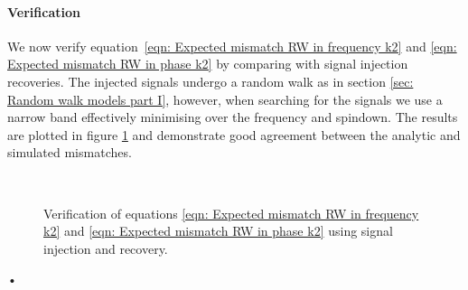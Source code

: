 \paragraph{Verification}

We now verify equation~\eqref{eqn: Expected mismatch RW in frequency k2} and
\eqref{eqn: Expected mismatch RW in phase k2} by comparing with signal
injection recoveries. The injected signals undergo a random walk as in section
\ref{sec: Random walk models part I}, however, when searching for the signals we 
use a narrow band effectively minimising over the frequency and spindown. The 
results are plotted in figure \ref{fig: verification of minimised RW} and 
demonstrate good agreement between the analytic and simulated mismatches.

\begin{figure}[ht]
\centering
{} 
\\
\caption{Verification of equations \eqref{eqn: Expected mismatch RW in
frequency k2} and \eqref{eqn: Expected mismatch RW in phase k2} using signal
injection and recovery.}
\label{fig: verification of minimised RW}
\end{figure}•
\FloatBarrier

